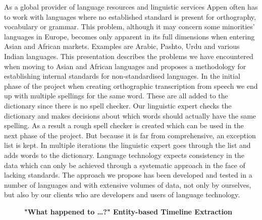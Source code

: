 \documentclass[10pt, a4paper, twopage, headinclude, footinclude, BCOR5mm]{scrartcl}
\begin{document}
\noindent
As a global provider of language resources and linguistic services Appen often has to work with languages where no established standard is present for orthography, vocabulary or grammar. This problem, although it may concern some minorities’ languages in Europe, becomes only apparent in its full dimensions when entering Asian and African markets. Examples are Arabic, Pashto, Urdu and various Indian languages. This presentation describes the problems we have encountered when moving to Asian and African languages and proposes a methodology for establishing internal standards for non-standardised languages. In the initial phase of the project when creating orthographic transcription from speech we end up with multiple spellings for the same word. These are all added to the dictionary since there is no spell checker. Our linguistic expert checks the dictionary and makes decisions about which words should actually have the same spelling. As a result a rough spell checker is created which can be used in the next phase of the project. But because it is far from comprehensive, an exception list is kept. In multiple iterations the linguistic expert goes through the list and adds words to the dictionary. Language technology expects consistency in the data which can only be achieved through a systematic approach in the face of lacking standards. The approach we propose has been developed and tested in a number of languages and with extensive volumes of data, not only by ourselves, but also by our clients who are developers and users of language technology. 


\newpage

\begin{figure}[t!]
\centering
\large\textbf{"What happened to …?"  Entity-based Timeline Extraction}
\vspace*{0.5cm}
\end{figure}


        \begin{table}[t!]
    \end{table}
\end{document}
